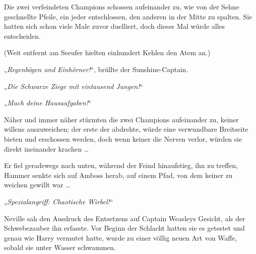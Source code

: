 Die zwei verfeindeten Champions schossen aufeinander zu, wie von der Sehne geschnellte Pfeile, ein jeder entschlossen, den anderen in der Mitte zu spalten. Sie hatten sich schon viele Male zuvor duelliert, doch dieses Mal würde alles entscheiden.

(Weit entfernt am Seeufer hielten einhundert Kehlen den Atem an.)

„\emph{Regenbögen und Einhörner!}“, brüllte der Sunshine-Captain.

„\emph{Die Schwarze Ziege mit eintausend Jungen!}“

„\emph{Mach deine Hausaufgaben!}“

Näher und immer näher stürmten die zwei Champions aufeinander zu, keiner willens auszuweichen; der erste der abdrehte, würde eine verwundbare Breitseite bieten und erschossen werden, doch wenn keiner die Nerven verlor, würden sie direkt ineinander krachen …

Er fiel geradewegs nach unten, während der Feind hinaufstieg, ihn zu treffen, Hammer senkte sich auf Amboss herab, auf einem Pfad, von dem keiner zu weichen gewillt war …

„\emph{Spezialangriff: Chaotische Wirbel!}“

Neville sah den Ausdruck des Entsetzens auf Captain Weasleys Gesicht, als der Schwebezauber ihn erfasste. Vor Beginn der Schlacht hatten sie es getestet und genau wie Harry vermutet hatte, wurde  zu einer völlig neuen Art von Waffe, sobald sie unter Wasser schwammen.

